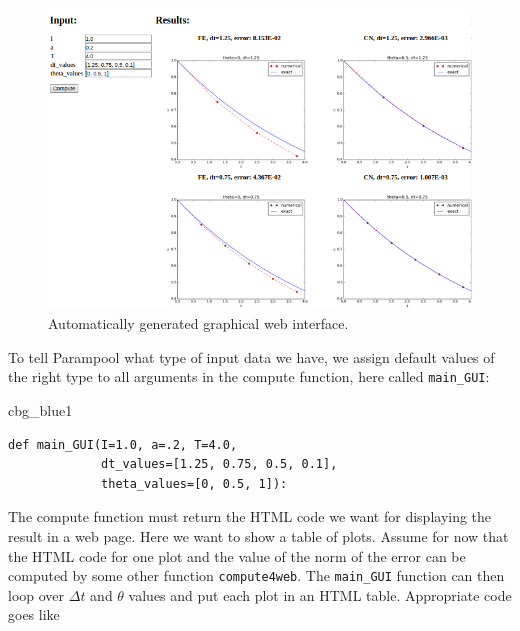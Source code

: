 \documentclass[%
oneside,                 %
final,                   %
10pt]{article}
\newenvironment{_cod_tight}[1]{
   \def\FrameCommand{\colorbox{#1}}
   \FrameRule0.6pt\MakeFramed {\FrameRestore}\vskip3mm}
   {\vskip0mm\endMakeFramed}
\newenvironment{cod}[1]{
\bgroup\rmfamily
\fboxsep=0mm\relax
\begin{_cod_tight}{#1}
\list{}{\parsep=-2mm\parskip=0mm\topsep=0pt\leftmargin=2mm
\rightmargin=2\leftmargin\leftmargin=4pt\relax}
\item\relax}
{\endlist\end{_cod_tight}\egroup}
\begin{document}
\begin{figure}[!ht]  %
  \centerline{\includegraphics[width=1.0\linewidth]{fig-softeng/web_GUI.png}}
  \caption{
  Automatically generated graphical web interface. \label{softeng1:fig:GUI}
  }
\end{figure}



To tell Parampool what type of input data we have,
we assign default values of the right type to all arguments in the
compute function, here called \Verb!main_GUI!:

\begin{cod}{cbg_blue1}\begin{Verbatim}[numbers=none,fontsize=\fontsize{9pt}{9pt},baselinestretch=0.95,xleftmargin=2mm]
def main_GUI(I=1.0, a=.2, T=4.0,
             dt_values=[1.25, 0.75, 0.5, 0.1],
             theta_values=[0, 0.5, 1]):
\end{Verbatim}
\end{cod}
\noindent

The compute function must return the HTML code we want for displaying
the result in a web page. Here we want to show a
table of plots.
Assume for now that the HTML code for one plot and the value of the
norm of the error can be computed by some other function \texttt{compute4web}.
The \Verb!main_GUI! function can then loop over $\Delta t$ and $\theta$
values and put each plot in an HTML table. Appropriate code goes like
\end{document}
